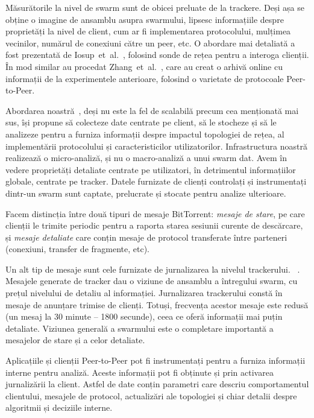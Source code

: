 Măsurătorile la nivel de swarm sunt de obicei preluate de la trackere. Deși
așa se obține o imagine de ansamblu asupra swarmului, lipsesc informațiile
despre proprietăți la nivel de client, cum ar fi implementarea protocolului,
mulțimea vecinilor, numărul de conexiuni către un peer, etc. O abordare
mai detaliată a fost prezentată de 
Iosup~et~al.~\cite{corr-overlay}, folosind sonde de rețea pentru a interoga
clienții. În mod similar au procedat
Zhang~et~al.~\cite{p2p-trace-archive}, care au creat o arhivă online cu
informații de la experimentele anterioare, folosind o varietate de protocoale
Peer-to-Peer.

Abordarea noastră~\cite{enhanced-logging}, deși nu este la fel de scalabilă
precum cea menționată mai sus, își propune să colecteze date centrate
pe client, să le stocheze și să le analizeze pentru a furniza informații
despre impactul topologiei de rețea, al implementării protocolului și
caracteristicilor utilizatorilor. Infrastructura noastră realizează o
micro-analiză, și nu o macro-analiză a unui swarm dat. Avem în vedere
proprietăți detaliate centrate pe utilizatori, în detrimentul informațiilor
globale, centrate pe tracker. Datele furnizate de clienți controlați și
instrumentați dintr-un swarm sunt captate, prelucrate și stocate pentru
analize ulterioare.

Facem distincția între două tipuri de mesaje BitTorrent:
\textit{mesaje de stare}, pe care clienții le trimite periodic pentru a
raporta starea sesiunii curente de descărcare, și \textit{mesaje detaliate}
care conțin mesaje de protocol transferate între parteneri (conexiuni,
transfer de fragmente, etc).

Un alt tip de mesaje sunt cele furnizate de jurnalizarea la nivelul trackerului.
~\cite{tracker-mon}. Mesajele generate de tracker dau o viziune de ansamblu a
întregului swarm, cu prețul nivelului de detaliu al informației. Jurnalizarea
trackerului constă în mesaje de anunțare trimise de clienți. Totuși,
frecvența acestor mesaje este redusă (un mesaj la 30 minute -- 1800 secunde),
ceea ce oferă informații mai puțin detaliate. Viziunea generală a swarmului
este o completare importantă a mesajelor de stare și a celor detaliate.

Aplicațiile și clienții Peer-to-Peer pot fi instrumentați pentru a furniza
informații interne pentru analiză. Aceste informații pot fi obținute și prin
activarea jurnalizării la client. Astfel de date conțin parametri care descriu
comportamentul clientului, mesajele de protocol, actualizări ale topologiei
și chiar detalii despre algoritmii și deciziile interne.

